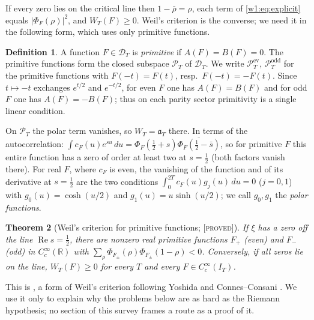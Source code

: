 \documentclass[11pt]{amsart}
\newtheorem{theorem}{Theorem}[section]
\theoremstyle{definition}
\newtheorem{definition}[theorem]{Definition}
\theoremstyle{remark}
\numberwithin{equation}{section}
\newcommand{\R}{\mathbb{R}}
\DeclareMathOperator{\Rel}{Re}
\newcommand{\IT}{I_T}                                  %
\newcommand{\cF}{c_F}                                  %
\newcommand{\PhiF}{\Phi_F}                             %
\newcommand{\PT}{\mathcal{P}_T}                        %
\newcommand{\DT}{\mathcal{D}_T}                        %
\newcommand{\aT}{\mathfrak{a}_T}                       %
\newcommand{\WT}{W_T}                                  %
\newcommand{\stag}[1]{\textsc{[#1]}}
\newcommand{\PROVED}{\stag{proved}}
\begin{document}
If every zero lies on the critical line then $1-\bar\rho=\rho$, each term of
\eqref{w1:eq:explicit} equals $|\PhiF(\rho)|^2$, and $\WT(F)\ge0$. Weil's
criterion is the converse; we need it in the following form, which uses only
primitive functions.

\begin{definition}\label{w1:def:primitive}
A function $F\in\DT$ is \emph{primitive} if $A(F)=B(F)=0$. The primitive
functions form the closed subspace $\PT$ of $\DT$. We write $\PT^{\mathrm{ev}}$,
$\PT^{\mathrm{odd}}$ for the primitive functions with $F(-t)=F(t)$,
resp.\ $F(-t)=-F(t)$. Since $t\mapsto -t$ exchanges $e^{t/2}$ and $e^{-t/2}$,
for even $F$ one has $A(F)=B(F)$ and for odd $F$ one has $A(F)=-B(F)$; thus
on each parity sector primitivity is a single linear condition.
\end{definition}

On $\PT$ the polar term vanishes, so $\WT=\aT$ there. In terms of the
autocorrelation: $\int\cF(u)e^{su}\,du=\PhiF(\frac12+s)\overline{\PhiF(\frac12-\bar s)}$,
so for primitive $F$ this entire function has a zero of order at least two at
$s=\frac12$ (both factors vanish there). For real $F$, where $\cF$ is even,
the vanishing of the function and of its derivative at $s=\frac12$ are the two
conditions $\int_0^{2T}\cF(u)g_j(u)\,du=0$ ($j=0,1$) with $g_0(u)=\cosh(u/2)$
and $g_1(u)=u\sinh(u/2)$; we call $g_0,g_1$ the \emph{polar functions}.

\begin{theorem}[Weil's criterion for primitive functions; \PROVED]\label{w1:thm:criterion}
If $\xi$ has a zero off the line $\Rel s=\frac12$, there are nonzero real
primitive functions $F_+$ (even) and $F_-$ (odd) in $C_c^\infty(\R)$ with
$\sum_\rho\Phi_{F_\pm}(\rho)\Phi_{F_\pm}(1-\rho)<0$. Conversely, if all zeros
lie on the line, $\WT(F)\ge0$ for every $T$ and every $F\in C_c^\infty(\IT)$.
\end{theorem}

This is \cite[Theorem~6.2]{P45}, a form of Weil's criterion \cite{Weil52}
following Yoshida \cite{Yoshida1992} and Connes--Consani
\cite{ConnesConsani2021}. We use it only to explain why the problems below
are as hard as the Riemann hypothesis; no section of this survey frames a
route as a proof of it.
\end{document}
